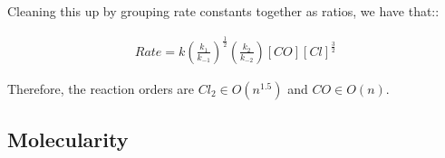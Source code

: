 \documentclass[12pt]{book}
\begin{document}
Cleaning this up by grouping rate constants together as ratios, we have that::

\begin{align*}
    Rate=k\left(\frac{k_1}{k_{-1}}\right)^{\frac{1}{2}}\left(\frac{k_2}{k_{-2}}\right)[CO][Cl]^{\frac{3}{2}}
\end{align*}

Therefore, the reaction orders are $Cl_2\in O(n^{1.5})$ and $CO\in O(n)$.

\subsection*{Molecularity}

\end{document}
